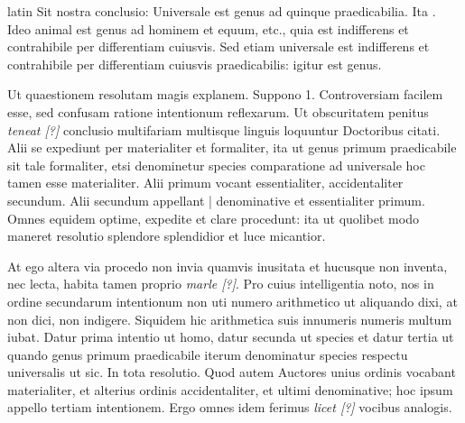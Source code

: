 \begin{otherlanguage*}{latin}
\pstart
Sit nostra conclusio:
Universale est genus ad quinque praedicabilia. Ita . Ideo animal est genus ad hominem et equum, etc., quia est indifferens et contrahibile per differentiam cuiusvis. Sed etiam universale est indifferens et contrahibile per differentiam cuiusvis praedicabilis:
igitur est genus. 
\pend

\pstart
Ut quaestionem resolutam magis explanem. Suppono 1. Controversiam facilem esse, sed confusam ratione intentionum reflexarum. Ut obscuritatem penitus \emph{teneat [?]} conclusio multifariam multisque linguis loquuntur Doctoribus citati. Alii se expediunt per materialiter et formaliter, ita ut genus primum praedicabile sit tale formaliter, etsi denominetur species comparatione ad universale hoc tamen esse materialiter. Alii primum vocant essentialiter, accidentaliter secundum. Alii secundum appellant \textnormal{|} denominative et essentialiter primum. Omnes equidem optime, expedite et clare procedunt:
ita ut quolibet modo maneret resolutio splendore splendidior et luce micantior. 
\pend

\pstart
At ego altera via procedo non invia quamvis inusitata et hucusque non inventa, nec lecta, habita tamen proprio \emph{marle [?]}. Pro cuius intelligentia noto, nos in ordine secundarum intentionum non uti numero arithmetico ut aliquando dixi, at non dici, non indigere. Siquidem hic arithmetica suis innumeris numeris multum iubat. Datur prima intentio ut homo, datur secunda ut species et datur tertia ut quando genus primum praedicabile iterum denominatur species respectu universalis ut sic. In tota resolutio. Quod autem Auctores unius ordinis vocabant materialiter, et alterius ordinis accidentaliter, et ultimi denominative; hoc ipsum appello tertiam intentionem. Ergo omnes idem ferimus \emph{licet [?]} vocibus analogis. 
\pend


\end{otherlanguage*}
